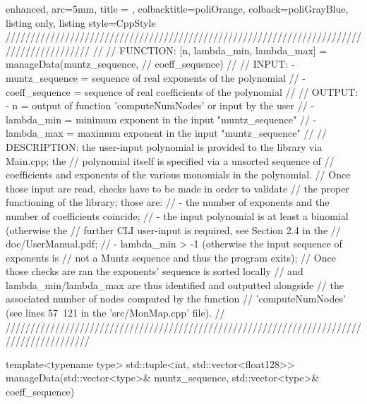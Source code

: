 \documentclass[a4paper, twosided]{book}
\begin{document}
\begin{tcblisting}{enhanced,
                   arc=5mm,
                   title = \color{black}{\large \ttfamily DatIo.cpp/manageData},
                   colbacktitle=poliOrange,
                   colback=poliGrayBlue,
                   listing only,
                   listing style=CppStyle}
/////////////////////////////////////////////////////////////////////////////////////////
//
//       FUNCTION: [n, {lambda_min, lambda_max}] = manageData(muntz_sequence, 
//                                                              coeff_sequence)
//                
//        INPUT: - muntz_sequence = sequence of real exponents of the polynomial
//               - coeff_sequence = sequence of real coefficients of the polynomial
//
//       OUTPUT: - n = output of function 'computeNumNodes' or input by the user
//               - lambda_min = minimum exponent in the input "muntz_sequence"
//               - lambda_max = maximum exponent in the input "muntz_sequence"
//
//    DESCRIPTION: the user-input polynomial is provided to the library via Main.cpp; the
//                 polynomial itself is specified via a unsorted sequence of 
//                 coefficients and exponents of the various monomials in the polynomial.
//                 Once those input are read, checks have to be made in order to validate
//                 the proper functioning of the library; those are:
//                    - the number of exponents and the number of coefficients coincide;
//                    - the input polynomial is at least a binomial (otherwise the 
//                      further CLI user-input is required, see Section 2.4 in the
//                      doc/UserManual.pdf; 
//                    - lambda_min > -1 (otherwise the input sequence of exponents is 
//                      not a Muntz sequence and thus the program exits);
//                 Once those checks are ran the exponents' sequence is sorted locally
//                 and lambda_min/lambda_max are thus identified and outputted alongside
//                 the associated number of nodes computed by the function 
//                 'computeNumNodes' (see lines 57~121 in the 'src/MonMap.cpp' file).
//
/////////////////////////////////////////////////////////////////////////////////////////

template<typename type>
std::tuple<int, std::vector<float128>> manageData(std::vector<type>& muntz_sequence, std::vector<type>& coeff_sequence)
\end{tcblisting}
\end{document}
